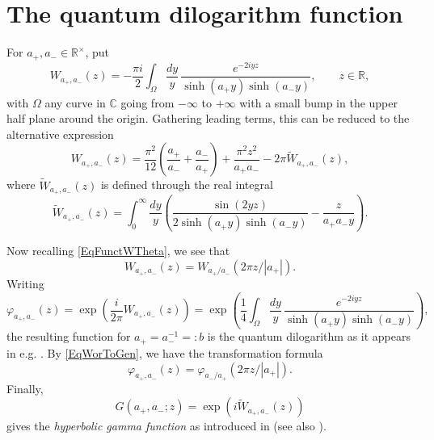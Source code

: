 \documentclass[11pt, reqno]{amsart}
\theoremstyle{definition}
\numberwithin{equation}{section}
\def\C{\mathbb C}
\def\R{\mathbb R}
\begin{document}
\appendix

\section{The quantum dilogarithm function}\label{Apqdilog}

For $a_+,a_- \in \R^{\times}$, put
\begin{equation}\label{EqGenFormW}
W_{a_+,a_-}(z) = -\frac{\pi i}{2} \int_{\Omega} \frac{dy}{y}\, \frac{e^{-2 iyz}}{\sinh(a_+y)\sinh(a_-y)},\qquad z \in \R,
\end{equation}
with $\Omega$ any curve in $\C$ going from $-\infty$ to $+\infty$ with a small bump in the upper half plane around the origin. Gathering leading terms, this can be reduced to the alternative expression
\begin{equation}\label{EqGenFormWAlt}
W_{a_+,a_-}(z) = \frac{\pi^2}{12}\left(\frac{a_+}{a_-} + \frac{a_-}{a_+}\right) + \frac{\pi^2z^2}{a_+a_-} -2\pi \widetilde{W}_{a_+,a_-}(z), 
\end{equation}
where $\widetilde{W}_{a_+,a_-}(z)$ is defined through the real integral
\begin{equation}\label{EqGenFormWReal}
\widetilde{W}_{a_+,a_-}(z) = \int_0^{\infty} \frac{dy}{y}\left(\frac{\sin(2yz)}{2\sinh(a_+y)\sinh(a_-y)} - \frac{z}{a_+a_-y}\right).
\end{equation}

Now recalling \eqref{EqFunctWTheta}, we see that
\begin{equation}\label{EqWorToGen}
W_{a_+,a_-}(z) = W_{a_+/a_-}(2\pi z/|a_+|).
\end{equation}
Writing 
\begin{equation}\label{EqTwoVarPhi}
\varphi_{a_+,a_-}(z) = \exp\left(\frac{i}{2\pi}W_{a_+,a_-}(z)\right) = \exp\left(\frac{1}{4}\int_{\Omega} \frac{dy}{y}\, \frac{e^{-2 iyz}}{\sinh(a_+y)\sinh(a_-y)}\right),
\end{equation}
the resulting function for $a_+ =a_-^{-1}=:b$ is the quantum dilogarithm as it appears in e.g. \cite{Fad95,Kas01,FG09}. By \eqref{EqWorToGen}, we have the transformation formula 
\begin{equation}\label{EqWorToGenExp}
\varphi_{a_+,a_-}(z) = \varphi_{a_-/a_+}(2\pi z/|a_+|).
\end{equation}
Finally, 
\begin{equation}
G(a_+,a_-;z) = \exp(i \widetilde{W}_{a_+,a_-}(z))
\end{equation}
gives the \emph{hyperbolic gamma function} as introduced in \cite{Rui97} (see also \cite[Appendix A]{Rui05}). 
\end{document}
